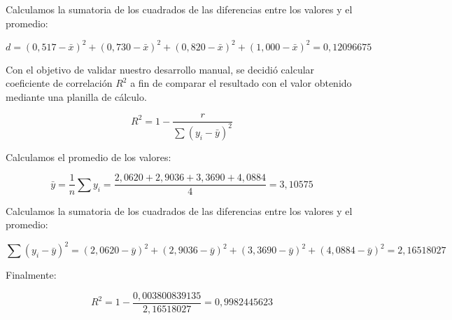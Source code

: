 Calculamos la sumatoria de los cuadrados de las diferencias entre los valores y el promedio:

\begin{equation}
    d =
    (0{,}517 - \bar{x})^2 +
    (0{,}730 - \bar{x})^2 +
    (0{,}820 - \bar{x})^2 +
    (1{,}000 - \bar{x})^2
    = 0{,}12096675
    \label{eq:dispersion-cuadrados-minimos-r}
\end{equation}


\clearpage

Con el objetivo de validar nuestro desarrollo manual, se decidió calcular coeficiente de correlación $R^2$ a fin de comparar el resultado con el valor obtenido mediante una planilla de cálculo.

\begin{equation}
    R^2 = 1 - \frac{r}{\sum (y_i - \bar{y})^2}
    \label{eq:error-cuadrados-minimos-formula-R2}
\end{equation}

Calculamos el promedio de los valores:

\begin{equation}
    \bar{y} = \frac{1}{n} \sum y_i = \frac{2{,}0620 + 2{,}9036 + 3{,}3690 + 4{,}0884}{4} = 3{,}10575
    \label{eq:error-cuadrados-minimos-promedio-para-R2}
\end{equation}

Calculamos la sumatoria de los cuadrados de las diferencias entre los valores y el promedio:

\begin{equation}
    \sum (y_i - \bar{y})^2 =
    (2{,}0620 - \bar{y})^2 +
    (2{,}9036 - \bar{y})^2 +
    (3{,}3690 - \bar{y})^2 +
    (4{,}0884 - \bar{y})^2
    = 2{,}16518027
    \label{eq:error-cuadrados-minimos-divisor-para-R2}
\end{equation}

Finalmente:

\begin{equation}
    R^2 = 1 - \frac{0{,}003800839135}{2{,}16518027} = 0{,}9982445623
    \label{eq:error-cuadrados-minimos-formula-R2-resolucion}
\end{equation}



